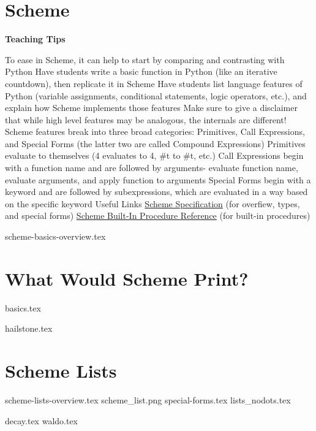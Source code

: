 \documentclass{exam}
\begin{document}
\section{Scheme}
\begin{guide}
\begin{blocksection}
\textbf{Teaching Tips}
\begin{outline}[enumerate]
    \1 To ease in Scheme, it can help to start by comparing and contrasting with Python
    \2 Have students write a basic function in Python (like an iterative countdown), then replicate it in Scheme
    \2 Have students list language features of Python (variable assignments, conditional statements, logic operators, etc.), and explain how Scheme implements those features
    \2 Make sure to give a disclaimer that while high level features may be analogous, the internals are different!
    \1 Scheme features break into three broad categories: Primitives, Call Expressions, and Special Forms (the latter two are called Compound Expressions)
    \2 Primitives evaluate to themselves (4 evaluates to 4, \#t to \#t, etc.)
    \2 Call Expressions begin with a function name and are followed by arguments- evaluate function name, evaluate arguments, and apply function to arguments
    \2 Special Forms begin with a keyword and are followed by subexpressions, which are evaluated in a way based on the specific keyword
    \1 Useful Links
    \2 \href{https://cs61a.org/articles/scheme-spec/}{Scheme Specification} (for overfiew, types, and special forms)
    \2 \href{https://cs61a.org/articles/scheme-builtins/}{Scheme Built-In Procedure Reference} (for built-in procedures)
\end{outline}
\end{blocksection}
\end{guide}

{scheme-basics-overview.tex}
\begin{questions}
\newpage
\section{What Would Scheme Print?}
{basics.tex}

{hailstone.tex}

\section{Scheme Lists}
{scheme-lists-overview.tex}
{scheme_list.png}
{special-forms.tex}
\newpage
{lists_nodots.tex}

{decay.tex}
{waldo.tex}

\end{questions}
\end{document}
